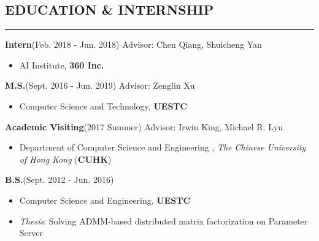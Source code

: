 \documentclass{res}
\begin{document}

\address{Master Student \\School of Computer Science and Engineering \\University of Electronic Science and Technology of China \textbf{(UESTC)}}

\address{Email: jinmian.y@gmail.com \\
         Phone: (86) 177 0811 2046 \\ Github: https://github.com/ay27}

\begin{resume}


\section{EDUCATION \& INTERNSHIP}
\vspace{-1ex}
\noindent\rule[0.1\baselineskip]{\textwidth}{1pt}
\textbf{Intern}\quad (Feb. 2018 - Jun. 2018)  \hfill Advisor: Chen Qiang, Shuicheng Yan
\begin{itemize}\setlength{\itemsep}{-0.5ex}
\item AI Institute, \textbf{360 Inc.}
\end{itemize}
\vspace{-2ex}
\textbf{M.S.}\quad (Sept. 2016 - Jun. 2019) \hspace{178pt} Advisor: Zenglin Xu
\begin{itemize}\setlength{\itemsep}{-0.5ex}
\item Computer Science and Technology, \textbf{UESTC}
\end{itemize}
\vspace{-2ex}
\textbf{Academic Visiting}\quad (2017 Summer) \hspace{144pt} Advisor: Irwin King, Michael R. Lyu
\begin{itemize}\setlength{\itemsep}{-0.5ex}
\item Department of Computer Science and Engineering , \textit{The Chinese University of Hong Kong} (\textbf{CUHK})
\end{itemize}
\vspace{-2ex}
\textbf{B.S.}\quad (Sept. 2012 - Jun. 2016)
\begin{itemize}\setlength{\itemsep}{-0.5ex}
\item Computer Science and Engineering, \textbf{UESTC}
\item \textit{Thesis}: Solving ADMM-based distributed matrix factorization on Parameter Server
\end{itemize}



\end{resume}
\end{document}
